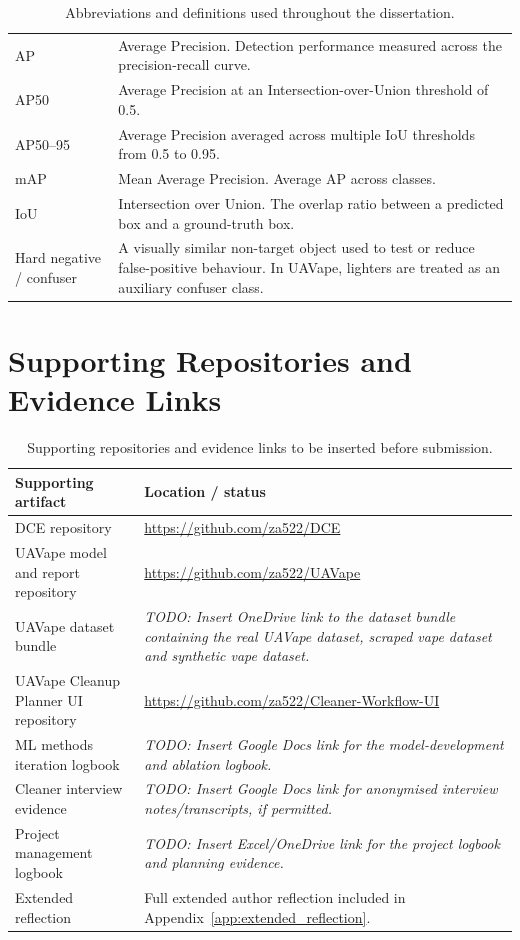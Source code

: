 \begin{table}[H]
\begin{tabularx}{\textwidth}{p{} X}
AP & Average Precision. Detection performance measured across the precision-recall curve. \\
AP50 & Average Precision at an Intersection-over-Union threshold of 0.5. \\
AP50--95 & Average Precision averaged across multiple IoU thresholds from 0.5 to 0.95. \\
mAP & Mean Average Precision. Average AP across classes. \\
IoU & Intersection over Union. The overlap ratio between a predicted box and a ground-truth box. \\
Hard negative / confuser & A visually similar non-target object used to test or reduce false-positive behaviour. In UAVape, lighters are treated as an auxiliary confuser class. \\
\bottomrule
\end{tabularx}
\caption{Abbreviations and definitions used throughout the dissertation.}
\label{tab:appendix_abbreviations_definitions}
\end{table}

\section{Supporting Repositories and Evidence Links}

\begin{table}[H]
\centering
\small
\begin{tabularx}{\textwidth}{p{} X}
\toprule
\textbf{Supporting artifact} & \textbf{Location / status} \\
\midrule
DCE repository & \url{https://github.com/za522/DCE} \\
UAVape model and report repository & \url{https://github.com/za522/UAVape} \\
UAVape dataset bundle & \textit{TODO: Insert OneDrive link to the dataset bundle containing the real UAVape dataset, scraped vape dataset and synthetic vape dataset.} \\
UAVape Cleanup Planner UI repository & \url{https://github.com/za522/Cleaner-Workflow-UI} \\
ML methods iteration logbook & \textit{TODO: Insert Google Docs link for the model-development and ablation logbook.} \\
Cleaner interview evidence & \textit{TODO: Insert Google Docs link for anonymised interview notes/transcripts, if permitted.} \\
Project management logbook & \textit{TODO: Insert Excel/OneDrive link for the project logbook and planning evidence.} \\
Extended reflection & Full extended author reflection included in Appendix~\ref{app:extended_reflection}. \\
\bottomrule
\end{tabularx}
\caption{Supporting repositories and evidence links to be inserted before submission.}
\label{tab:appendix_supporting_links}
\end{table}


